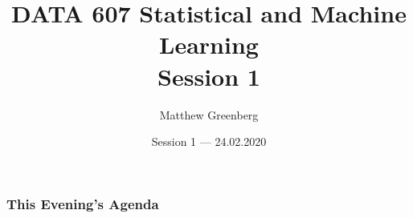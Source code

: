 \documentclass[xcolor={dvipsnames}]{beamer}
\title[DATA 607]{DATA 607 Statistical and Machine Learning\\
Session 1}
\author{Matthew Greenberg}
\institute[]{Department of Mathematics and Statistics\\
University of Calgary}
\date{Session 1 --- 24.02.2020}
\begin{document}
\frame{\titlepage}

\begin{frame}
    \frametitle{This Evening's Agenda}
    \tableofcontents
    \end{frame}



        
        
        
        
\end{document}

